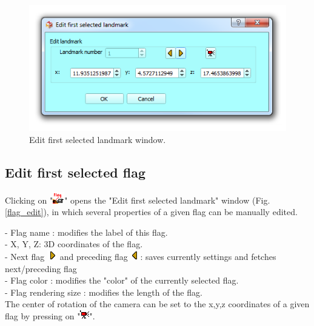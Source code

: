 \begin{figure}
  \centering
  \includegraphics[scale=0.55]{images/06/objects/edit_landmark.png} 
	\caption{Edit first selected landmark window.}
\label{landmark_edit}
 
\end{figure}

\subsection{Edit first selected flag}
Clicking on "\includegraphics[scale=0.7]{images/06/objects/flag_edit.png}" opens the "Edit first selected landmark" window (Fig. \ref{flag_edit}), in which several properties of a given flag can be manually edited.

- Flag name : modifies the label of this flag.\\
- X, Y, Z: 3D coordinates of the flag.\\
- Next flag \includegraphics[scale=0.7]{images/06/objects/s_right.png} and preceding flag \includegraphics[scale=0.7]{images/06/objects/s_left.png}: saves currently  settings and fetches next/preceding flag\\
- Flag color : modifies the "color" of the currently selected flag.\\
- Flag rendering size : modifies the length of the flag.\\
The center of rotation of the camera can be set to the x,y,z coordinates of a given flag by pressing on "\includegraphics[scale=0.7]{images/06/objects/move_cam3.png}".


